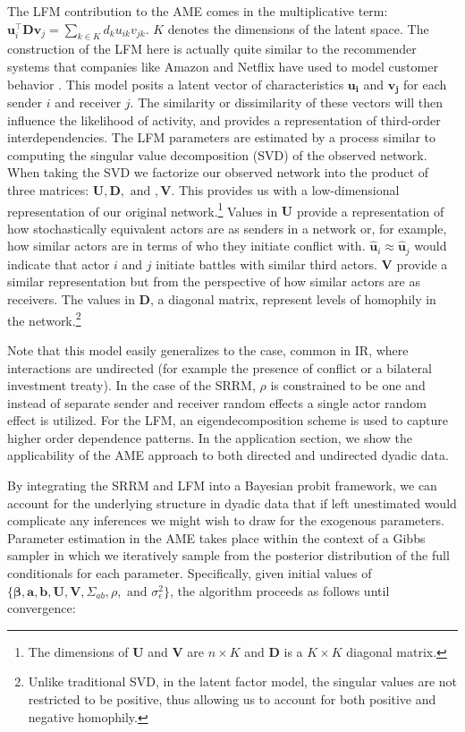 The LFM contribution to the AME comes in the multiplicative term: $\mathbf{u}_{i}^{\top} \mathbf{D} \mathbf{v}_{j}=\sum_{k \in K} d_{k} u_{ik} v_{jk}$. $K$ denotes the dimensions of the latent space. The construction of the LFM here is actually quite similar to the recommender systems that companies like Amazon and Netflix have used to model customer behavior \citep{resnick:varian:1997,bennett:etal:2007}. This model posits a latent vector of characteristics $\mathbf{u_{i}}$ and $\mathbf{v_{j}}$ for each sender $i$ and receiver $j$. The similarity or dissimilarity of these vectors will then influence the likelihood of activity, and provides a representation of third-order interdependencies. The LFM parameters are estimated by a process similar to computing the singular value decomposition (SVD) of the observed network. When taking the SVD we factorize our observed network into the product of three matrices: $\mathbf{U}, \mathbf{D}, \text{ and }, \mathbf{V}$. This provides us with a low-dimensional representation of our original network.\footnote{The dimensions of $\mathbf{U}$ and $\mathbf{V}$ are $n \times K$ and $\mathbf{D}$ is a $K \times K$ diagonal matrix.} Values in $\mathbf{U}$ provide a representation of how stochastically equivalent actors are as senders in a network or, for example, how similar actors are in terms of who they initiate conflict with. $\hat{\mathbf{u}}_{i} \approx \hat{\mathbf{u}}_{j}$ would indicate that actor $i$ and $j$ initiate battles with similar third actors. $\mathbf{V}$ provide a similar representation but from the perspective of how similar actors are as receivers. The values in $\mathbf{D}$, a diagonal matrix, represent levels of homophily in the network.\footnote{Unlike traditional SVD, in the latent factor model, the singular values are not restricted to be positive, thus allowing us to account for both positive and negative homophily.} 

Note that this model easily generalizes to the case, common in IR, where interactions are undirected (for example the presence of conflict or a bilateral investment treaty). In the case of the SRRM, $\rho$ is constrained to be one and instead of separate sender and receiver random effects a single actor random effect is utilized. For the LFM, an eigendecomposition scheme is used to capture higher order dependence patterns. In the application section, we show the applicability of the AME approach to both directed and undirected dyadic data.

By integrating the SRRM and LFM into a Bayesian probit framework, we can account for the underlying structure in dyadic data that if left unestimated would complicate any inferences we might wish to draw for the exogenous parameters. Parameter estimation in the AME takes place within the context of a Gibbs sampler in which we iteratively sample from the posterior distribution of the full conditionals for each parameter. Specifically, given initial values of $\{\bm\beta, \mathbf{a}, \mathbf{b}, \mathbf{U}, \mathbf{V}, \Sigma_{ab}, \rho, \text{ and } \sigma_{\epsilon}^{2}\}$, the algorithm proceeds as follows until convergence:

